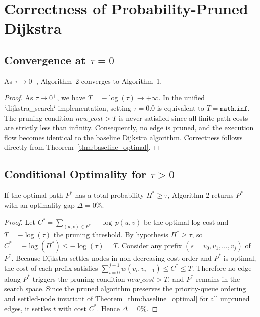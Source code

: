 \section{Correctness of Probability-Pruned Dijkstra}

\subsection{Convergence at \texorpdfstring{$\tau = 0$}{tau = 0}}

\begin{theorem}[Convergence]\label{thm:convergence}
As $\tau \to 0^+$, Algorithm~2 converges to Algorithm~1.
\end{theorem}

\begin{proof}
As $\tau \to 0^+$, we have $T = -\log(\tau) \to +\infty$. In the unified `dijkstra_search` implementation, setting $\tau = 0.0$ is equivalent to $T = \mathtt{math.inf}$. The pruning condition $\mathit{new\_cost} > T$ is never satisfied since all finite path costs are strictly less than infinity. Consequently, no edge is pruned, and the execution flow becomes identical to the baseline Dijkstra algorithm. Correctness follows directly from Theorem~\ref{thm:baseline_optimal}.
\end{proof}

\subsection{Conditional Optimality for \texorpdfstring{$\tau > 0$}{tau > 0}}


\begin{theorem}\label{thm:conditional}
If the optimal path $P^*$ has a total probability $\Pi^* \geq \tau$, Algorithm 2 returns $P^*$ with an optimality gap $\Delta = 0\%$.
\end{theorem}

\begin{proof}
Let $C^* = \sum_{(u,v)\in P^*} -\log\,p(u,v)$ be the optimal log-cost and $T = -\log(\tau)$ the pruning threshold. By hypothesis $\Pi^* \geq \tau$, so $C^* = -\log(\Pi^*) \leq -\log(\tau) = T$. Consider any prefix $(s = v_0, v_1, \ldots, v_j)$ of $P^*$. Because Dijkstra settles nodes in non-decreasing cost order and $P^*$ is optimal, the cost of each prefix satisfies $\sum_{i=0}^{j-1} w(v_i, v_{i+1}) \leq C^* \leq T$. Therefore no edge along $P^*$ triggers the pruning condition $\mathit{new\_cost} > T$, and $P^*$ remains in the search space. Since the pruned algorithm preserves the priority-queue ordering and settled-node invariant of Theorem~\ref{thm:baseline_optimal} for all unpruned edges, it settles $t$ with cost $C^*$. Hence $\Delta = 0\%$.
\end{proof}

